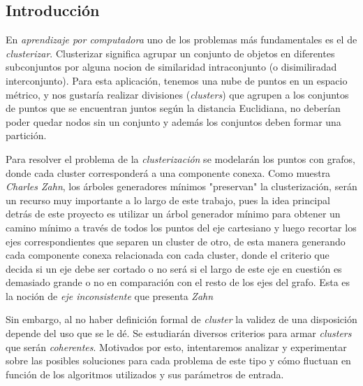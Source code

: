 \subsection{Introducción}

En \textit{aprendizaje por computadora} uno de los problemas más fundamentales es el de \textit{clusterizar}.
Clusterizar significa agrupar un conjunto de objetos en diferentes subconjuntos por alguna
nocion de similaridad intraconjunto (o disimiliradad interconjunto). Para esta aplicación, tenemos
una nube de puntos en un espacio métrico, y nos gustaría realizar divisiones (\textit{clusters}) que
agrupen a los conjuntos de puntos que se encuentran juntos según la distancia Euclidiana, no deberían poder quedar nodos sin un conjunto y además los conjuntos deben formar una partición.

\vskip 8pt

Para resolver el problema de la \textit{clusterización} se modelarán los puntos con grafos, donde cada cluster corresponderá a una componente conexa. Como muestra \textit{Charles Zahn}, los árboles generadores mínimos "preservan" la clusterización, serán un recurso muy importante a lo largo de este trabajo, pues la idea principal detrás de este proyecto es utilizar un árbol generador mínimo para obtener un camino mínimo a través de todos los puntos del eje cartesiano y luego recortar los ejes correspondientes que separen un cluster de otro, de esta manera generando cada componente conexa relacionada con cada cluster, donde el criterio que decida si un eje debe ser cortado o no será si el largo de este eje en cuestión es demasiado grande o no en comparación con el resto de los ejes del grafo. Esta es la noción de \textit{eje inconsistente} que presenta \textit{Zahn}

\vskip 8pt

Sin embargo, al no haber definición formal de \textit{cluster} la validez de una disposición depende del uso que se le dé. Se estudiarán diversos criterios para armar \textit{clusters} que serán \textit{coherentes}. Motivados por esto, intentaremos analizar y experimentar sobre las posibles soluciones para cada problema de este tipo y cómo fluctuan en función de los algoritmos utilizados y sus parámetros de entrada.

